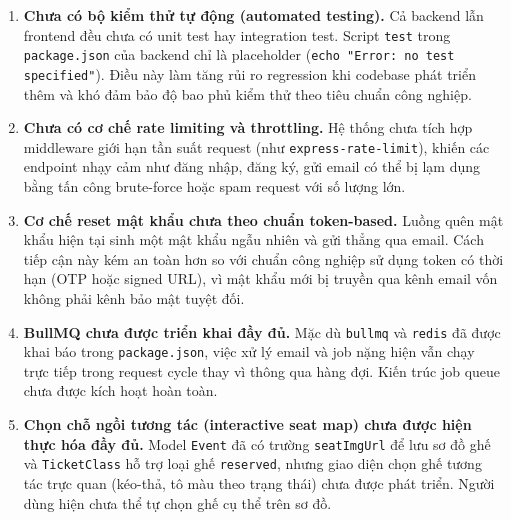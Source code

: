 \begin{enumerate}[leftmargin=*, label=\textbf{\arabic*.}]

    \item \textbf{Chưa có bộ kiểm thử tự động (automated testing).}
    Cả backend lẫn frontend đều chưa có unit test hay integration test.
    Script \texttt{test} trong \texttt{package.json} của backend chỉ
    là placeholder (\texttt{echo "Error: no test specified"}). Điều này
    làm tăng rủi ro regression khi codebase phát triển thêm và khó đảm
    bảo độ bao phủ kiểm thử theo tiêu chuẩn công nghiệp.

    \item \textbf{Chưa có cơ chế rate limiting và throttling.}
    Hệ thống chưa tích hợp middleware giới hạn tần suất request (như
    \texttt{express-rate-limit}), khiến các endpoint nhạy cảm như đăng
    nhập, đăng ký, gửi email có thể bị lạm dụng bằng tấn công brute-force
    hoặc spam request với số lượng lớn.

    \item \textbf{Cơ chế reset mật khẩu chưa theo chuẩn token-based.}
    Luồng quên mật khẩu hiện tại sinh một mật khẩu ngẫu nhiên và gửi
    thẳng qua email. Cách tiếp cận này kém an toàn hơn so với chuẩn
    công nghiệp sử dụng token có thời hạn (OTP hoặc signed URL), vì
    mật khẩu mới bị truyền qua kênh email vốn không phải kênh bảo mật
    tuyệt đối.

    \item \textbf{BullMQ chưa được triển khai đầy đủ.}
    Mặc dù \texttt{bullmq} và \texttt{redis} đã được khai báo trong
    \texttt{package.json}, việc xử lý email và job nặng hiện vẫn chạy
    trực tiếp trong request cycle thay vì thông qua hàng đợi. Kiến trúc
    job queue chưa được kích hoạt hoàn toàn.

    \item \textbf{Chọn chỗ ngồi tương tác (interactive seat map) chưa
    được hiện thực hóa đầy đủ.}
    Model \texttt{Event} đã có trường \texttt{seatImgUrl} để lưu sơ đồ
    ghế và \texttt{TicketClass} hỗ trợ loại ghế \texttt{reserved}, nhưng
    giao diện chọn ghế tương tác trực quan (kéo-thả, tô màu theo trạng
    thái) chưa được phát triển. Người dùng hiện chưa thể tự chọn ghế cụ
    thể trên sơ đồ.



\end{enumerate}
